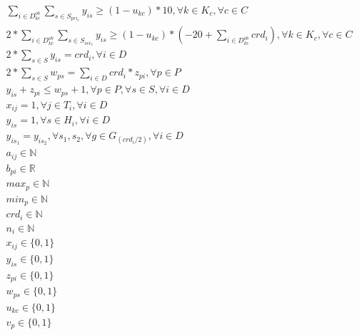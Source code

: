 \begin{eqnarray}
\label{r16}
\sum_{i \in{D_{kc}^{ob}}}^{}{\sum_{s \in{S_{pri_c}}}^{}{y_{is}}} \geq (1 - u_{kc}) * 10, \forall{k}\in{K_c}, \forall{c}\in{C}  &&\\
\label{r17}
2*\sum_{i \in{D_{kc}^{ob}}}^{}{\sum_{s \in{S_{sec_c}}}^{}{y_{is}}}\geq (1 - u_{kc}) * (-20+\sum_{i \in{D_{kc}^{ob}}}^{}{crd_i}),\forall{k}\in{K_c}, \forall{c}\in{C}&&\\
\label{r18}
2*\sum_{s \in S}^{}{y_{is}} = crd_i, \forall{i}\in{D}  &&\\
\label{r19}
2 * \sum_{s \in S}^{}{w_{ps}} = \sum_{i \in D}^{}{crd_i * z_{pi}}, \forall{p}\in{P} &&\\
\label{r20}
y_{is} + z_{pi} \le w_{ps} + 1, \forall{p}\in{P}, \forall{s}\in{S}, \forall{i}\in{D} &&\\
\label{r21}
x_{ij} = 1, \forall{j\in{T_i}},\forall{i \in{D}} &&\\
\label{r22}
y_{is} = 1, \forall{s \in{H_i}}, \forall{i \in{D}} &&\\
\label{r23}
y_{is_1} = y_{is_2}, \forall{s_1, s_2}, \forall{g\in{G_{(crd_i/2)}}}, \forall{i\in{D}} &&\\
\label{r24}
a_{ij}\in{\mathbb{N}} &&\\
\label{r25}
b_{pi} \in{\mathbb{R}} &&\\
\label{r26}
max_{p} \in{\mathbb{N}} &&\\
\label{r27}
min_{p} \in{\mathbb{N}} &&\\
\label{r28}
crd_{i} \in{\mathbb{N}} &&\\
\label{r29}
n_{i} \in{\mathbb{N}} &&\\
\label{r30}
x_{ij}\in{\{0,1\}} &&\\
\label{r31}
y_{is}\in{\{0,1\}} &&\\
\label{r32}
z_{pi}\in{\{0,1\}} &&\\
\label{r33}
w_{ps}\in{\{0,1\}} && \\
\label{r34}
u_{kc}\in{\{0,1\}} && \\
\label{r35}
v_{p}\in{\{0,1\}} &&
\end{eqnarray}